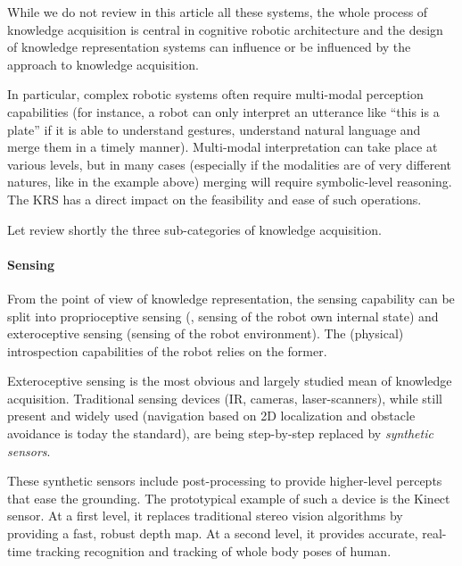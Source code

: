 While we do not review in this article all these systems, the whole process of
knowledge acquisition is central in cognitive robotic architecture and the
design of knowledge representation systems can influence or be influenced by
the approach to knowledge acquisition.

In particular, complex robotic systems often require multi-modal perception
capabilities (for instance, a robot can only interpret an utterance like ``this
is a plate'' if it is able to understand gestures, understand natural language
and merge them in a timely manner). Multi-modal interpretation can take place
at various levels, but in many cases (especially if the modalities are of very
different natures, like in the example above) merging will require
symbolic-level reasoning. The KRS has a direct impact on the feasibility and
ease of such operations.

Let review shortly the three sub-categories of knowledge acquisition.

\begin{scriptsize}
\begin{center}
\end{center}
\end{scriptsize}

\paragraph{Sensing}

From the point of view of knowledge representation, the sensing capability can
be split into proprioceptive sensing (\ie, sensing of the robot own internal
state) and exteroceptive sensing (sensing of the robot environment). The
(physical) introspection capabilities of the robot relies on the former.

Exteroceptive sensing is the most obvious and largely studied mean of knowledge
acquisition. Traditional sensing devices (IR, cameras, laser-scanners), while
still present and widely used (navigation based on 2D localization and obstacle
avoidance is today the standard), are being step-by-step replaced by
\emph{synthetic sensors}.

These synthetic sensors include post-processing to provide higher-level
percepts that ease the grounding. The prototypical example of such a device is
the Kinect sensor. At a first level, it replaces traditional stereo vision
algorithms by providing a fast, robust depth map. At a second level, it
provides accurate, real-time tracking recognition and tracking of whole body
poses of human.

